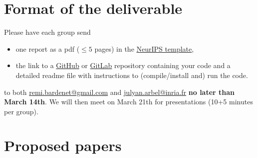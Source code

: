 \documentclass[12pt]{article}%
\begin{document}
\section{Format of the deliverable}
Please have each group send
\begin{itemize}
\item one report as a pdf ($\leq 5$ pages) in the \href{https://www.overleaf.com/latex/templates/neurips-2020/mnshsmqkjsqz}{NeurIPS template},
\item the link to a \href{https://github.com/}{GitHub} or \href{https://about.gitlab.com/}{GitLab} repository containing your code and a detailed readme file with instructions to (compile/install and) run the code.
\end{itemize} to both \href{mailto:remi.bardenet@gmail.com}{remi.bardenet@gmail.com} and \href{mailto: julyan.arbel@inria.fr}{julyan.arbel@inria.fr} {\bf no later than March 14th}. 
We will then meet on March 21th for presentations (10+5 minutes per group).

\section{Proposed papers}
\label{s:papers}



\end{document}
